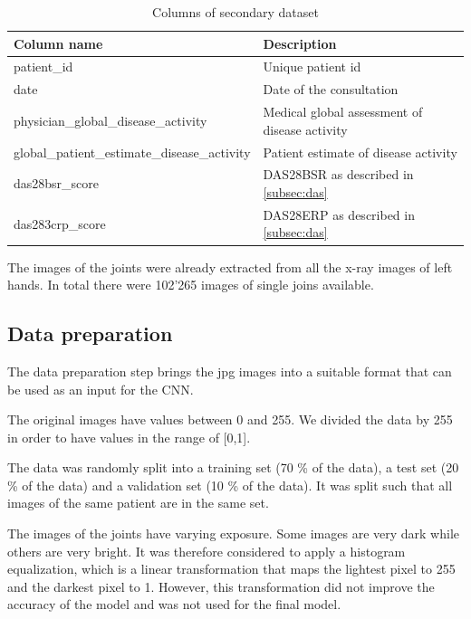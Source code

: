 \documentclass[12pt]{article}
\begin{document}
\begin{table}[ht]
\centering
\caption{Columns of secondary dataset}
\label{tab:sec_dataset}
\begin{tabular}{@{}ll@{}}
\toprule
Column name   & Description                                           \\ \midrule
patient\_id   & Unique patient id                                     \\
date       & Date of the consultation                              \\
physician\_global\_disease\_activity       & Medical global assessment of disease activity                \\
global\_patient\_estimate\_disease\_activity     & Patient estimate of disease activity   \\
das28bsr\_score    & DAS28BSR as described in \autoref{subsec:das}             \\
das283crp\_score & DAS28ERP as described in \autoref{subsec:das} \\ \bottomrule
\end{tabular}
\end{table}


The images of the joints were already extracted from all the x-ray images of left hands. In total there were 102'265 images of single joins available.


\subsection{Data preparation}
\label{subsec:data_prep}

The data preparation step brings the jpg images into a suitable format that can be used as an input for the CNN. 

The original images have values between 0 and 255. We divided the data by 255 in order to have values in the range of [0,1].

The data was randomly split into a training set (70 \% of the data), a test set (20 \% of the data) and a validation set (10 \% of the data). It was split such that all images of the same patient are in the same set.

The images of the joints have varying exposure. Some images are very dark while others are very bright. It was therefore considered to apply a histogram equalization, which is a linear transformation that maps the lightest pixel to 255 and the darkest pixel to 1. However, this transformation did not improve the accuracy of the model and was not used for the final model.
\end{document}
